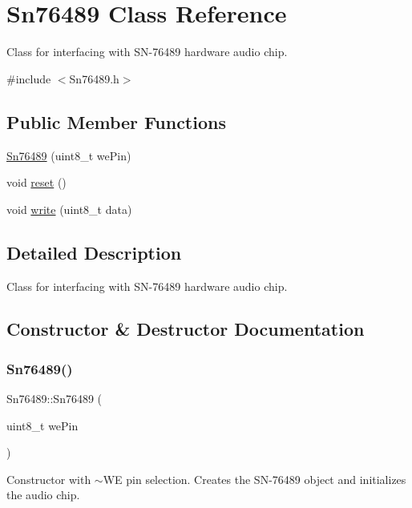 \hypertarget{classSn76489}{}\section{Sn76489 Class Reference}
\label{classSn76489}


Class for interfacing with S\+N-\/76489 hardware audio chip.  




{\ttfamily \#include $<$Sn76489.\+h$>$}

\subsection*{Public Member Functions}
\begin{DoxyCompactItemize}
\item 
\mbox{\hyperlink{classSn76489_a16f9e53fdd1e9d7841f520e5600130cd}{Sn76489}} (uint8\+\_\+t we\+Pin)
\item 
void \mbox{\hyperlink{classSn76489_a904bb7ddb48bb425181bcdae443c49fb}{reset}} ()
\item 
void \mbox{\hyperlink{classSn76489_a5add4d0735cd8edbd03eb1c54bd09532}{write}} (uint8\+\_\+t data)
\end{DoxyCompactItemize}


\subsection{Detailed Description}
Class for interfacing with S\+N-\/76489 hardware audio chip. 

\subsection{Constructor \& Destructor Documentation}
\mbox{\label{classSn76489_a16f9e53fdd1e9d7841f520e5600130cd}} 
\subsubsection{\texorpdfstring{Sn76489()}{Sn76489()}}
{\footnotesize\ttfamily Sn76489\+::\+Sn76489 (\begin{DoxyParamCaption}\item[{uint8\+\_\+t}]{we\+Pin }\end{DoxyParamCaption})}

Constructor with $\sim$\+WE pin selection. Creates the S\+N-\/76489 object and initializes the audio chip.


